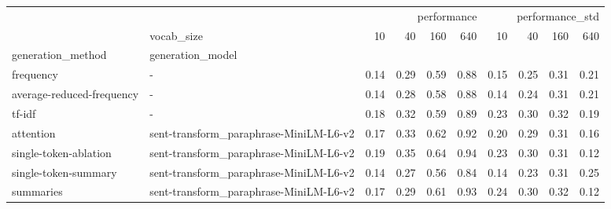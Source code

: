 \begin{tabular}{llrrrrrrrr}
\toprule
 &  & \multicolumn{4}{r}{performance} & \multicolumn{4}{r}{performance\_std} \\
 & vocab\_size & 10 & 40 & 160 & 640 & 10 & 40 & 160 & 640 \\
generation\_method & generation\_model &  &  &  &  &  &  &  &  \\
\midrule
frequency & - & 0.14 & 0.29 & 0.59 & 0.88 & 0.15 & 0.25 & 0.31 & 0.21 \\
\cline{1-10}
average-reduced-frequency & - & 0.14 & 0.28 & 0.58 & 0.88 & 0.14 & 0.24 & 0.31 & 0.21 \\
\cline{1-10}
tf-idf & - & 0.18 & 0.32 & 0.59 & 0.89 & 0.23 & 0.30 & 0.32 & 0.19 \\
\cline{1-10}
attention & sent-transform\_paraphrase-MiniLM-L6-v2 & 0.17 & 0.33 & 0.62 & 0.92 & 0.20 & 0.29 & 0.31 & 0.16 \\
\cline{1-10}
single-token-ablation & sent-transform\_paraphrase-MiniLM-L6-v2 & 0.19 & 0.35 & 0.64 & 0.94 & 0.23 & 0.30 & 0.31 & 0.12 \\
\cline{1-10}
single-token-summary & sent-transform\_paraphrase-MiniLM-L6-v2 & 0.14 & 0.27 & 0.56 & 0.84 & 0.14 & 0.23 & 0.31 & 0.25 \\
\cline{1-10}
summaries & sent-transform\_paraphrase-MiniLM-L6-v2 & 0.17 & 0.29 & 0.61 & 0.93 & 0.24 & 0.30 & 0.32 & 0.12 \\
\cline{1-10}
\bottomrule
\end{tabular}
